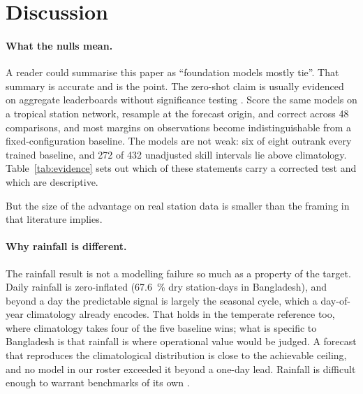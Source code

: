 \section{Discussion}
\label{sec:discussion}

\paragraph{What the nulls mean.} A reader could summarise this paper as ``foundation models mostly tie''. That
summary is accurate and is the point. The zero-shot claim is usually evidenced on aggregate leaderboards without
significance testing \citep{godahewa2021monash,aksu2024gifteval,qiu2024tfb,li2025tsfmbench}. Score the same models on a tropical station network, resample at the forecast origin, and
correct across 48 comparisons, and most margins on observations become indistinguishable from a fixed-configuration
baseline. The models are not weak: six of eight outrank every trained baseline, and 272 of 432 unadjusted skill
intervals lie above climatology. Table~\ref{tab:evidence} sets out which of these statements carry a corrected test
and which are descriptive.

 But the size of the advantage on real station data is smaller than the
framing in that literature implies.

\paragraph{Why rainfall is different.} The rainfall result is not a modelling failure so much as a property of the
target. Daily rainfall is zero-inflated (\SI{67.6}{\percent} dry station-days in Bangladesh), and beyond a day the
predictable signal is largely the seasonal cycle, which a day-of-year climatology already encodes. That holds in
the temperate reference too, where climatology takes four of the five baseline wins; what is specific to
Bangladesh is that rainfall is where operational value would be judged. A
forecast that reproduces the climatological distribution is close to the achievable ceiling, and no model in our
roster exceeded it beyond a one-day lead. Rainfall is difficult enough to warrant benchmarks of its own
\citep{zhang2025rainfallbench}.

